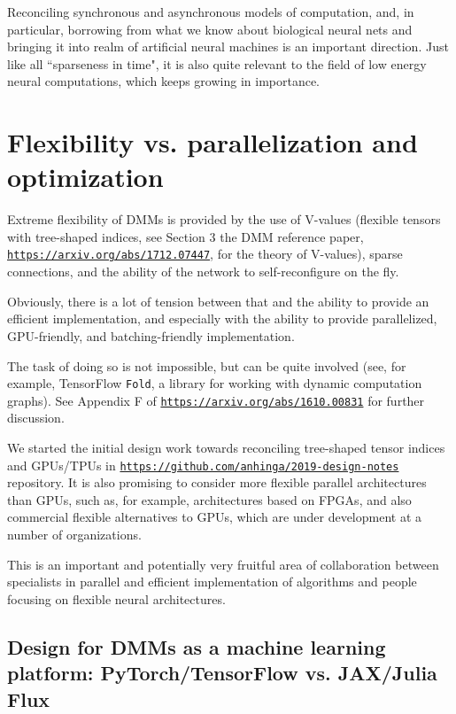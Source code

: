 \documentclass{article}
\begin{document}
Reconciling synchronous and asynchronous models of computation, and, in particular, borrowing from
what we know about biological neural nets and bringing it into realm of artificial neural machines is
an important direction. Just like all ``sparseness in time", it is also quite relevant to the field of low energy
neural computations, which keeps growing in importance.

\section{Flexibility vs. parallelization and optimization} 

Extreme flexibility of DMMs is provided by the use of V-values (flexible tensors with tree-shaped indices, 
see Section 3 the DMM reference paper, \href{https://arxiv.org/abs/1712.07447}{\tt https://arxiv.org/abs/1712.07447}, for
the theory of V-values),
sparse connections, and the ability of the network to self-reconfigure on the fly.

Obviously, there is a lot of tension between that and the ability to provide an efficient implementation,
and especially with the ability to provide parallelized, GPU-friendly, and batching-friendly implementation.

The task of doing so is not impossible, but can be quite involved (see, for example, TensorFlow {\tt Fold},
a library for working with dynamic computation graphs). See Appendix F of \href{https://arxiv.org/abs/1610.00831}{\tt https://arxiv.org/abs/1610.00831} for further discussion.

We started the initial design work towards reconciling tree-shaped tensor indices and GPUs/TPUs in
\href{https://github.com/anhinga/2019-design-notes}{\tt https://github.com/anhinga/2019-design-notes}
repository. It is also promising to consider more flexible parallel architectures than GPUs, such
as, for example, architectures based on FPGAs, and also commercial flexible alternatives to GPUs,
which are under development at a number of organizations. 

This is an important and potentially very fruitful area of collaboration between specialists in parallel and efficient implementation
of algorithms and people focusing on flexible neural architectures.

\subsection{Design for DMMs as a machine learning platform: PyTorch/TensorFlow vs. JAX/Julia Flux}
\end{document}
